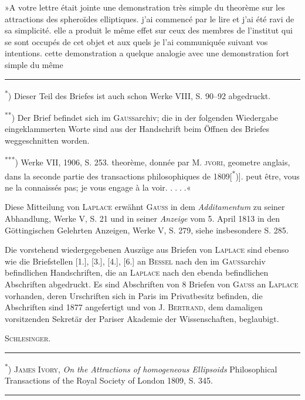 {\indent »A votre lettre était jointe une demonstration très simple du theorème sur les attractions des spheroïdes elliptiques. j’ai commencé par le lire et j’ai été ravi de sa simplicité. elle a produit le même effet sur ceux des membres de l’institut qui se sont occupés de cet objet et aux quels je l’ai communiquée suivant vos intentions. cette demonstration a quelque analogie avec une demonstration fort simple du même
\par\medskip\noindent\rule{.24\linewidth}{.4pt}\par\smallskip
\noindent\hspace*{\parindent}\textsuperscript{*}) Dieser Teil des Briefes ist auch schon Werke VIII, S. 90–92 abgedruckt.
\par\noindent\hspace*{\parindent}\textsuperscript{**}) Der Brief befindet sich im \textsc{Gauss}archiv; die in der folgenden Wiedergabe eingeklammerten Worte sind aus der Handschrift beim Öffnen des Briefes weggeschnitten worden.
\par\noindent\hspace*{\parindent}\textsuperscript{***}) Werke VII, 1906, S. 253.
\clearpage{}
\noindent theorème, donnée par M. \textsc{jvori}, geometre anglais, dans la seconde partie des transactions philosophiques de 1809[\textsuperscript{*})]. peut être, vous ne la connaissés pas; je vous engage à la voir. \({.}\;{.}\;{.}\;{.}\)«

\indent Diese Mitteilung von \textsc{Laplace} erwähnt \textsc{Gauss} in dem \textit{Additamentum} zu seiner Abhandlung, Werke V, S. 21 und in seiner \textit{Anzeige} vom 5. April 1813 in den Göttingischen Gelehrten Anzeigen, Werke V, S. 279, siehe insbesondere S. 285.

\indent Die vorstehend wiedergegebenen Auszüge aus Briefen von \textsc{Laplace} sind ebenso wie die Briefstellen [1.], [3.], [4.], [6.] an \textsc{Bessel} nach den im \textsc{Gauss}archiv befindlichen Handschriften, die an \textsc{Laplace} nach den ebenda befindlichen Abschriften abgedruckt. Es sind Abschriften von 8 Briefen von \textsc{Gauss} an \textsc{Laplace} vorhanden, deren Urschriften sich in Paris im Privatbesitz befinden, die Abschriften sind 1877 angefertigt und von J. \textsc{Bertrand}, dem damaligen vorsitzenden Sekretär der Pariser Akademie der Wissenschaften, beglaubigt.
\begin{flushright}\textsc{Schlesinger}.\end{flushright}
\par\medskip\noindent\rule{.24\linewidth}{.4pt}\par\smallskip
\noindent\hspace*{\parindent}\textsuperscript{*}) \textsc{James Ivory}, \textit{On the Attractions of homogeneous Ellipsoids} Philosophical Transactions of the Royal Society of London 1809, S. 345.
\par
\begin{center}\rule{.30\linewidth}{.4pt}\end{center}
\clearpage}
